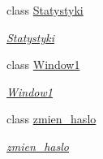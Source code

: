 \begin{DoxyCompactItemize}
class \mbox{\hyperlink{classprojekt_1_1_statystyki}{Statystyki}}
\begin{DoxyCompactList}\small\item\em \mbox{\hyperlink{classprojekt_1_1_statystyki}{Statystyki}} \end{DoxyCompactList}\item 
class \mbox{\hyperlink{classprojekt_1_1_window1}{Window1}}
\begin{DoxyCompactList}\small\item\em \mbox{\hyperlink{classprojekt_1_1_window1}{Window1}} \end{DoxyCompactList}\item 
class \mbox{\hyperlink{classprojekt_1_1zmien__haslo}{zmien\+\_\+haslo}}
\begin{DoxyCompactList}\small\item\em \mbox{\hyperlink{classprojekt_1_1zmien__haslo}{zmien\+\_\+haslo}} \end{DoxyCompactList}\end{DoxyCompactItemize}
